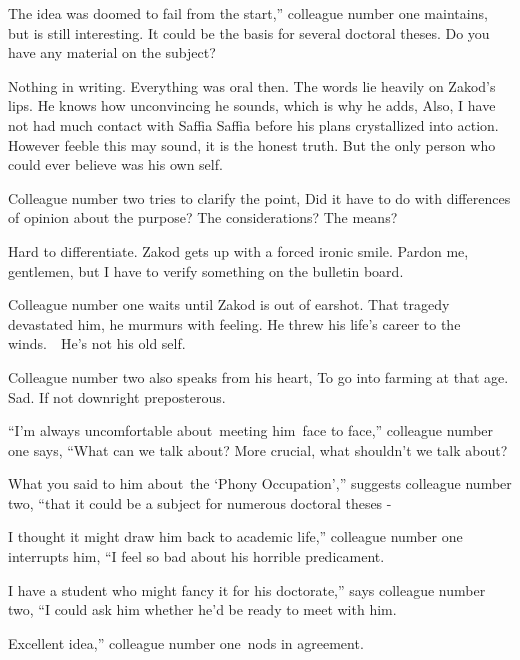 \documentclass[letterpaper]{article}
\begin{document}
{\textquotedbl}The idea was doomed to fail from the start,'' colleague number one maintains, {\textquotedbl}but is still
interesting. It could be the basis for several doctoral theses. Do you have any material on the subject?{\textquotedbl}


{\textquotedbl}Nothing in writing. Everything was oral then.{\textquotedbl} The words lie heavily on Zakod's lips. He
knows how unconvincing he sounds, which is why he adds, {\textquotedbl}Also, I have not had much contact with Saffia
Saffia before his plans crystallized into action.{\textquotedbl} However feeble this may sound, it is the honest truth.
But the only person who could ever believe was his own self.\ 

Colleague number two tries to clarify the point, {\textquotedbl}Did it have to do with differences of opinion about the
purpose? The considerations? The means?{\textquotedbl} 

{\textquotedbl}Hard to differentiate.{\textquotedbl} Zakod gets up with a forced ironic smile. {\textquotedbl}Pardon me,
gentlemen, but I have to verify something on the bulletin board.{\textquotedbl}

Colleague number one waits until Zakod is out of earshot. {\textquotedbl}That tragedy devastated him,{\textquotedbl} he
murmurs with feeling. {\textquotedbl}He threw his life's career to the winds.\ \ He's not his old self.{\textquotedbl} 

Colleague number two also speaks from his heart, {\textquotedbl}To go into farming at that age. Sad. If not downright
preposterous.{\textquotedbl} 

{}``I'm always uncomfortable about~meeting him~face to face,'' colleague number one says, ``What can we talk about? More
crucial, what shouldn't we talk about?{\textquotedbl}

{\textquotedbl}What you said to him about~the `Phony Occupation',{}'' suggests colleague number two, ``that it could be
a subject for numerous doctoral theses -{\textquotedbl} 

{\textquotedbl}I thought it might draw him back to academic life,'' colleague number one interrupts him, ``I feel so bad
about his horrible predicament.{\textquotedbl} 

{\textquotedbl}I have a student who might fancy it for his doctorate,'' says colleague number two, ``I could ask him
whether he'd be ready to meet with him.{\textquotedbl} 

{\textquotedbl}Excellent idea,'' colleague number one~nods in agreement. 
\end{document}
